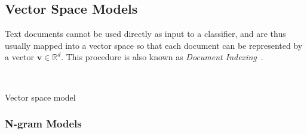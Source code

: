 


\subsection{Vector Space Models}
\label{sub:Vector Space Models}

Text documents cannot be used directly as input to a classifier, and are thus usually mapped into a vector space so that each document can be represented by a vector $\mathbf{v} \in \mathbb{R}^d$. This procedure is also known as \emph{Document Indexing}~\cite{Sebastiani:2002aa}.


~\cite[Chapter 14, p.~289]{Manning:2008aa}

Vector space model~\cite[Chapter 6.3, p.~120]{Manning:2008aa}

\cite[Chapter 6.2, p.~117]{Manning:2008aa}


\subsubsection{N-gram Models}
\label{subs:N-gram Models}

